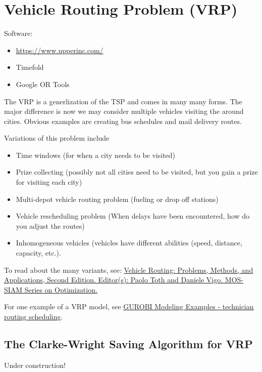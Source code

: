 \section{Vehicle Routing Problem (VRP)}

\begin{resource}
Software:
\begin{itemize}
\item \url{https://www.upperinc.com/}
\item Timefold
\item Google OR Tools
\end{itemize}
\end{resource}

The VRP is a generlization of the TSP and comes in many many forms.  The major difference is now we may consider multiple vehicles visiting the around cities.
Obvious examples are creating bus schedules and mail delivery routes.  

Variations of this problem include
\begin{itemize}
\item Time windows (for when a city needs to be visited)
\item Prize collecting (possibly not all cities need to be visited, but you gain a prize for visiting each city)
\item Multi-depot vehicle routing problem (fueling or drop off stations)
\item Vehicle rescheduling problem (When delays have been encountered, how do you adjust the routes)
\item Inhomogeneous vehicles (vehicles have different abilities (speed, distance, capacity, etc.).
\end{itemize}

To read about the many variants, see:
\href{https://doi-org.ezproxy.lib.vt.edu/10.1137/1.9781611973594}{
Vehicle Routing: Problems, Methods, and Applications, Second Edition. 
Editor(s): Paolo Toth and Daniele Vigo.  MOS-SIAM Series on Optimization.}

For one example of a VRP model, see \href{https://github.com/Gurobi/modeling-examples/tree/master/technician_routing_scheduling}{GUROBI Modeling Examples - technician routing scheduling}.

\subsection{The Clarke-Wright Saving Algorithm for VRP}
\begin{warn}
Under construction!
\end{warn}

